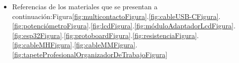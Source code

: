 \begin{itemize}
        \item Referencias de los materiales que se presentan a continuación:Figura\ref{fig:multicontactoFigura}.\ref{fig:cableUSB-CFigura}.\ref{fig:potenciómetroFigura}.\ref{fig:lcdFigura}.\ref{fig:móduloAdaptadorLcdFigura}.\ref{fig:esp32Figura}.\ref{fig:protoboardFigura}.\ref{fig:resistenciaFigura}.\ref{fig:cableMHFigura}.\ref{fig:cableMMFigura}.\ref{fig:tapeteProfesionalOrganizadorDeTrabajoFigura}
    \end{itemize}
